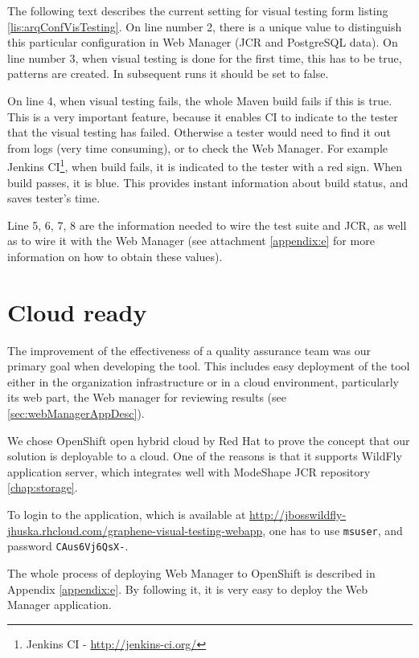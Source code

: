 \documentclass[11pt,oneside,final]{fithesis2}
\begin{document}
  The following text describes the current setting for visual testing form listing \ref{lis:arqConfVisTesting}. 
  On line number 2, there is a unique value to distinguish this particular configuration in Web Manager (JCR and PostgreSQL data).
  On line number 3, when visual testing is done for the first time, this has to be true, patterns are created. In subsequent runs it should be set to
  false. 
  
  On line 4, when visual testing fails, the whole Maven build fails if this is true. This is a very important feature, because it enables
  CI to indicate to the tester that the visual testing has failed. Otherwise a tester would need to find it out from logs (very time consuming),
  or to check the Web Manager. For example Jenkins CI\footnote{Jenkins CI - \url{http://jenkins-ci.org/}}, when build fails, it is indicated to the
  tester with a red sign. When build passes, it is blue. This provides instant information about build status, and saves tester's time.
  
  Line 5, 6, 7, 8 are the information needed to wire the test suite and JCR, as well as to wire it with the Web Manager (see attachment \ref{appendix:e}
  for more information on how to obtain these values).
  
  \section{Cloud ready}
  \label{sec:cloudReady}
  The improvement of the effectiveness of a quality assurance team was our primary goal when developing the tool. This includes easy 
  deployment of the tool either in the organization infrastructure or in a cloud environment, particularly its web part, the
  Web manager for reviewing results (see \ref{sec:webManagerAppDesc}).
  
  We chose OpenShift open hybrid cloud by Red Hat to prove the concept that our solution is deployable to a cloud. One of the
  reasons is that it supports WildFly application server, which integrates well with ModeShape JCR repository \ref{chap:storage}.
  
  To login to the application, which is available at \url{http://jbosswildfly-jhuska.rhcloud.com/graphene-visual-testing-webapp}, one has to 
  use \texttt{msuser}, and password \texttt{CAus6Vj6QsX-}.
  
  The whole process of deploying Web Manager to OpenShift is described in Appendix \ref{appendix:e}. By following it, it is very easy
  to deploy the Web Manager application.
  
\end{document}
